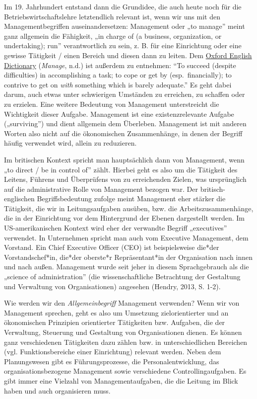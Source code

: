 \documentclass[
  letterpaper,
]{book}
\begin{document}
Im 19. Jahrhundert entstand dann die Grundidee, die auch heute noch für
die Betriebswirtschaftslehre letztendlich relevant ist, wenn wir uns mit
den Managementbegriffen auseinandersetzen: Management oder „to manage''
meint ganz allgemein die Fähigkeit, „in charge of (a business,
organization, or undertaking); run'' verantwortlich zu sein, z. B. für
eine Einrichtung oder eine gewisse Tätigkeit / einen Bereich und diesen
dann zu leiten. Dem
\href{https://www.oed.com/view/Entry/113210?isAdvanced=false&result=3&rskey=PtTs7q&}{Oxford
English Dictionary} (\emph{Manage}, n.d.) ist außerdem zu entnehmen:
``To succeed (despite difficulties) in accomplishing a task; to cope or
get by (esp.~financially); to contrive to get on \emph{with} something
which is barely adequate.'' Es geht dabei darum, auch etwas unter
schwierigen Umständen zu erreichen, zu schaffen oder zu erzielen. Eine
weitere Bedeutung von Management unterstreicht die Wichtigkeit dieser
Aufgabe. Management ist eine existenzrelevante Aufgabe („surviving'')
und dient allgemein dem Überleben. Management ist mit anderen Worten
also nicht auf die ökonomischen Zusammenhänge, in denen der Begriff
häufig verwendet wird, allein zu reduzieren.

Im britischen Kontext spricht man hauptsächlich dann von Management,
wenn „to direct / be in control of'' zählt. Hierbei geht es also um die
Tätigkeit des Leitens, Führens und Überprüfens von zu erreichenden
Zielen, was ursprünglich auf die administrative Rolle von Management
bezogen war. Der britisch-englischen Begriffsbedeutung zufolge meint
Management eher stärker die Tätigkeit, die wir in Leitungsaufgaben
ausüben, bzw. die Arbeitszusammenhänge, die in der Einrichtung vor dem
Hintergrund der Ebenen dargestellt werden. Im US-amerikanischen Kontext
wird eher der verwandte Begriff „executives'' verwendet. In Unternehmen
spricht man auch vom Executive Management, dem Vorstand. Ein Chief
Executive Officer (CEO) ist beispielsweise die*der Vorstandschef*in,
die*der oberste*r Repräsentant*in der Organisation nach innen und nach
außen. Management wurde seit jeher in diesem Sprachgebrauch als die
„science of administration'' (die wissenschaftliche Betrachtung der
Gestaltung und Verwaltung von Organisationen) angesehen (Hendry, 2013,
S. 1-2).

Wie werden wir den \emph{Allgemeinbegriff} Management verwenden? Wenn
wir von Management sprechen, geht es also um Umsetzung zielorientierter
und an ökonomischen Prinzipien orientierter Tätigkeiten bzw. Aufgaben,
die der Verwaltung, Steuerung und Gestaltung von Organisationen dienen.
Es können ganz verschiedenen Tätigkeiten dazu zählen bzw. in
unterschiedlichen Bereichen (vgl. Funktionsbereiche einer Einrichtung)
relevant werden. Neben dem Planungswesen gibt es Führungsprozesse, die
Personalentwicklung, das organisationsbezogene Management sowie
verschiedene Controllingaufgaben. Es gibt immer eine Vielzahl von
Managementaufgaben, die die Leitung im Blick haben und auch organisieren
muss.
\end{document}

